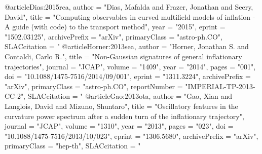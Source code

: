 @article{Dias:2015rca,
      author         = "Dias, Mafalda and Frazer, Jonathan and Seery, David",
      title          = "{Computing observables in curved multifield models of
                        inflation - A guide (with code) to the transport method}",
      year           = "2015",
      eprint         = "1502.03125",
      archivePrefix  = "arXiv",
      primaryClass   = "astro-ph.CO",
      SLACcitation   = "%
}
@article{Horner:2013sea,
      author         = "Horner, Jonathan S. and Contaldi, Carlo R.",
      title          = "{Non-Gaussian signatures of general inflationary
                        trajectories}",
      journal        = "JCAP",
      volume         = "1409",
      year           = "2014",
      pages          = "001",
      doi            = "10.1088/1475-7516/2014/09/001",
      eprint         = "1311.3224",
      archivePrefix  = "arXiv",
      primaryClass   = "astro-ph.CO",
      reportNumber   = "IMPERIAL-TP-2013-CC-2",
      SLACcitation   = "%
}
@article{Gao:2013ota,
      author         = "Gao, Xian and Langlois, David and Mizuno, Shuntaro",
      title          = "{Oscillatory features in the curvature power spectrum
                        after a sudden turn of the inflationary trajectory}",
      journal        = "JCAP",
      volume         = "1310",
      year           = "2013",
      pages          = "023",
      doi            = "10.1088/1475-7516/2013/10/023",
      eprint         = "1306.5680",
      archivePrefix  = "arXiv",
      primaryClass   = "hep-th",
      SLACcitation   = "%
}